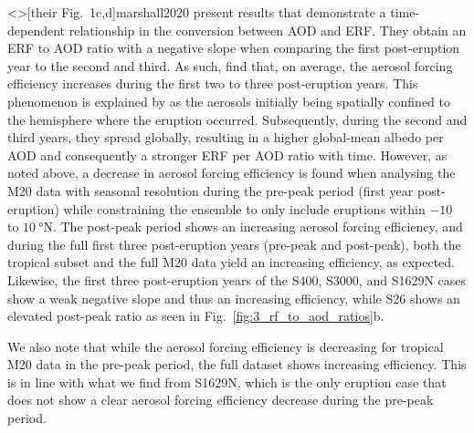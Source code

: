 \documentclass[draft]{agujournal2019}
\begin{document}
  \citeA<>[their Fig.\ 1c,d]{marshall2020} present results that demonstrate a
  time-dependent relationship in the conversion between AOD and ERF. They obtain an ERF
  to AOD ratio with a negative slope when comparing the first post-eruption year to the
  second and third. As such,  find that, on average, the aerosol
  forcing efficiency increases during the first two to three post-eruption years. This
  phenomenon is explained by  as the aerosols initially being
  spatially confined to the hemisphere where the eruption occurred. Subsequently, during
  the second and third years, they spread globally, resulting in a higher global-mean
  albedo per AOD and consequently a stronger ERF per AOD ratio with time. However, as
  noted above, a decrease in aerosol forcing efficiency is found when analysing the M20
  data with seasonal resolution during the pre-peak period (first year post-eruption)
  while constraining the ensemble to only include eruptions within \(-10\) to
  \(\SI{10}{\degree\mathrm{N}}\). The post-peak period shows an increasing aerosol
  forcing efficiency, and during the full first three post-eruption years (pre-peak and
  post-peak), both the tropical subset and the full M20 data yield an increasing
  efficiency, as expected. Likewise, the first three post-eruption years of the S400,
  S3000, and S1629N cases show a weak negative slope and thus an increasing efficiency,
  while S26 shows an elevated post-peak ratio as seen in
  Fig.~\ref{fig:3_rf_to_aod_ratios}b.

  We also note that while the aerosol forcing efficiency is decreasing for tropical M20
  data in the pre-peak period, the full dataset shows increasing efficiency. This is in
  line with what we find from S1629N, which is the only eruption case that does not show
  a clear aerosol forcing efficiency decrease during the pre-peak period.
\end{document}
